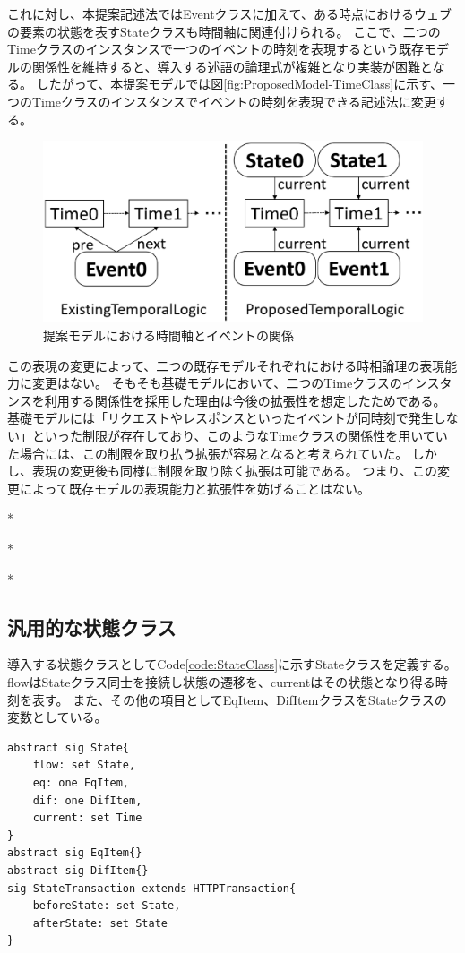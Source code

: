 \documentclass[journal]{IEEEtran}
\begin{document}
これに対し、本提案記述法ではEventクラスに加えて、ある時点におけるウェブの要素の状態を表すStateクラスも時間軸に関連付けられる。
ここで、二つのTimeクラスのインスタンスで一つのイベントの時刻を表現するという既存モデルの関係性を維持すると、導入する述語の論理式が複雑となり実装が困難となる。
したがって、本提案モデルでは図\ref{fig:ProposedModel-TimeClass}に示す、一つのTimeクラスのインスタンスでイベントの時刻を表現できる記述法に変更する。

\begin{figure}[htb]
\centering
\includegraphics[width=\hsize]{./fig/TimeClass.eps}
\caption{提案モデルにおける時間軸とイベントの関係}
\label{fig:TimeClass}
\end{figure}

この表現の変更によって、二つの既存モデルそれぞれにおける時相論理の表現能力に変更はない。
そもそも基礎モデルにおいて、二つのTimeクラスのインスタンスを利用する関係性を採用した理由は今後の拡張性を想定したためである。
基礎モデルには「リクエストやレスポンスといったイベントが同時刻で発生しない」といった制限が存在しており、このようなTimeクラスの関係性を用いていた場合には、この制限を取り払う拡張が容易となると考えられていた。
しかし、表現の変更後も同様に制限を取り除く拡張は可能である。
つまり、この変更によって既存モデルの表現能力と拡張性を妨げることはない。

*

*

*


\subsection{汎用的な状態クラス}
\label{sec:state-class}
導入する状態クラスとしてCode\ref{code:StateClass}に示すStateクラスを定義する。
flowはStateクラス同士を接続し状態の遷移を、currentはその状態となり得る時刻を表す。
また、その他の項目としてEqItem、DifItemクラスをStateクラスの変数としている。
\begin{lstlisting}[caption=Stateクラス, label=code:StateClass]
abstract sig State{
	flow: set State,
	eq: one EqItem,
	dif: one DifItem,
	current: set Time
}
abstract sig EqItem{}
abstract sig DifItem{}
sig StateTransaction extends HTTPTransaction{
	beforeState: set State,
	afterState: set State
}
\end{lstlisting}
\end{document}
